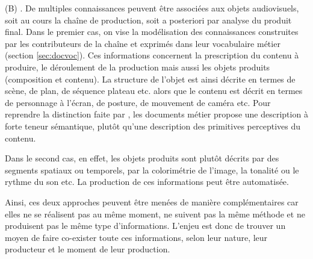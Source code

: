 \begin{liste}
	\item[(B)] .
	De multiples connaissances peuvent être associées aux objets audiovisuels, soit au cours la chaîne de production, soit a posteriori par analyse du produit final.
	Dans le premier cas, on vise la modélisation des connaissances construites par les contributeurs de la chaîne et exprimés dans leur vocabulaire métier (section \ref{sec:docvoc}). 
	Ces informations concernent la prescription du contenu à produire, le déroulement de la production mais aussi les objets produits (composition et contenu).
	La structure de l'objet est ainsi décrite en termes de scène, de plan, de séquence plateau etc. alors que le contenu est décrit en termes de personnage à l'écran, de posture, de mouvement de caméra etc. 
	Pour reprendre la distinction faite par \cite[\S 3.3.2.1 Descriptions du contenu, p.83]{ThiBui2003}, les documents métier propose une description à forte teneur sémantique, plutôt qu'une description des primitives perceptives du contenu.
	
	Dans le second cas, en effet, les objets produits sont plutôt décrits par des segments spatiaux ou temporels, par la colorimétrie de l'image, la tonalité ou le rythme du son etc. 
	La production de ces informations peut être automatisée. 
	
	Ainsi, ces deux approches peuvent être menées de manière complémentaires car elles ne se réalisent pas au même moment, ne suivent pas la même méthode et ne produisent pas le même type d'informations.
	L'enjeu est donc de trouver un moyen de faire co-exister toute ces informations, selon leur nature, leur producteur et le moment de leur production.
\end{liste}




